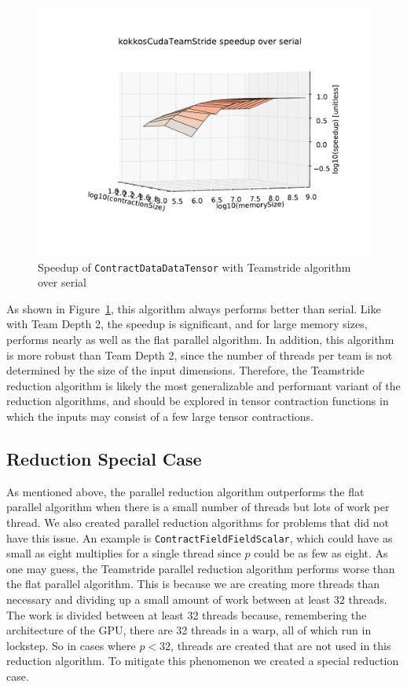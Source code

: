 \begin{figure}[ht]
    \includegraphics[width=5in]{./VersusSerial_kokkosCudaTeamStride_clearCache_shadowfax}
    \caption[Performance of \texttt{ContractDataDataTensor} Teamstride]{Speedup
        of \texttt{ContractDataDataTensor} with Teamstride algorithm over serial
\label{fig:ContractDataDataTensorTeamstride}} 
\end{figure}

As shown in Figure~\ref{fig:ContractDataDataTensorTeamstride}, this algorithm
always performs better than serial.  Like with Team Depth 2, the speedup is
significant, and for large memory sizes, performs nearly as well as the flat
parallel algorithm.  In addition, this algorithm is more robust than Team Depth
2, since the number of threads per team is not determined by the size of the
input dimensions.  Therefore, the Teamstride reduction algorithm is likely the
most generalizable and performant variant of the reduction algorithms, and
should be explored in tensor contraction functions in which the inputs may
consist of a few large tensor contractions.

\subsection{Reduction Special Case}
As mentioned above, the parallel reduction algorithm outperforms the flat
parallel algorithm when there is a small number of threads but lots of work per
thread. We also created parallel reduction algorithms for problems that did not
have this issue. An example is \texttt{ContractFieldFieldScalar}, which could have as
small as eight multiplies for a single thread since $p$ could be as few as
eight. As one may guess, the Teamstride parallel reduction algorithm performs
worse than the flat parallel algorithm. This is because we are creating more
threads than necessary and dividing up a small amount of work between at least
32 threads. The work is divided between at least 32 threads because, remembering
the architecture of the GPU, there are 32 threads in a warp, all of which run in
lockstep. So in cases where $p < 32$, threads are created that are not used in
this reduction algorithm. To mitigate this phenomenon we created a special
reduction case.

